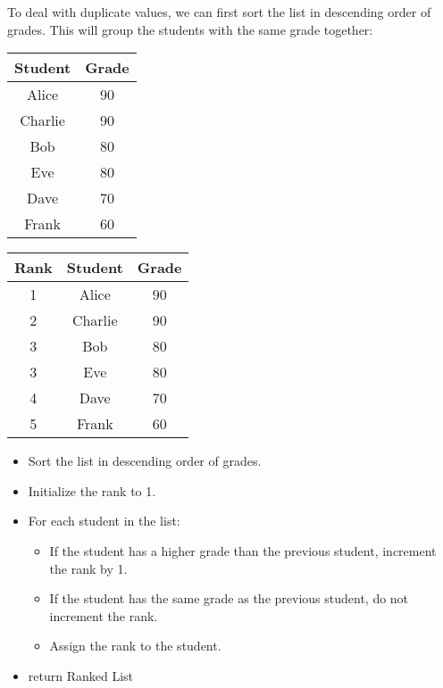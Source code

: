 To deal with duplicate values, we can first sort the list in descending order of grades. This will group the students with the same grade together:

\begin{center}
	\begin{tabular}{ |c|c| }

		\hline
		Student & Grade \\
		\hline
		Alice   & 90    \\
		Charlie & 90    \\
		Bob     & 80    \\
		Eve     & 80    \\
		Dave    & 70    \\
		Frank   & 60    \\
		\hline
	\end{tabular}
\end{center}
\begin{center}
	\begin{tabular}{|c|c|c|}
		\hline
		Rank & Student & Grade \\
		\hline
		1    & Alice   & 90    \\
		2    & Charlie & 90    \\
		3    & Bob     & 80    \\
		3    & Eve     & 80    \\
		4    & Dave    & 70    \\
		5    & Frank   & 60    \\
		\hline
	\end{tabular}
\end{center}

\begin{itemize}
	\item Sort the list in descending order of grades.
	\item Initialize the rank to 1.
	\item For each student in the list:
	      \begin{itemize}
		      \item If the student has a higher grade than the previous student, increment the rank by 1.
		      \item If the student has the same grade as the previous student, do not increment the rank.
		      \item Assign the rank to the student.
	      \end{itemize}
	\item return Ranked List
\end{itemize}

